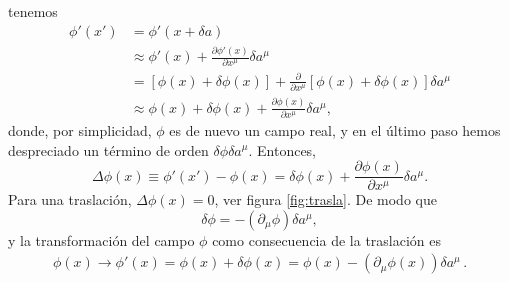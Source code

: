 tenemos
\begin{align}
  \phi'(x')&=\phi'(x+\delta a)\\
  &\approx\phi'(x)+\frac{\partial\phi'(x)}{\partial x^\mu}\delta a^\mu\\
  &=[\phi(x)+\delta\phi(x)]+\frac{\partial}{\partial x^\mu}[\phi(x)+\delta\phi(x)]\delta a^\mu\\
  &\approx\phi(x)+\delta\phi(x)+\frac{\partial\phi(x)}{\partial x^\mu}\delta a^\mu,
\end{align}
donde, por simplicidad, $\phi$ es de nuevo un campo real, y en el último paso hemos despreciado un término de orden $\delta\phi\delta a^\mu$. Entonces,
\begin{equation}
  \label{eq:Deltaf}
  \Delta\phi(x)\equiv\phi'(x')-\phi(x)=\delta\phi(x)+\frac{\partial\phi(x)}{\partial x^\mu}\delta a^\mu.
\end{equation}
Para una traslación, $\Delta\phi(x)=0$, ver figura 
\ref{fig:trasla}. %
De modo que
\begin{equation}
  \label{eq:dmuxmu}
  \delta\phi=-(\partial_\mu\phi)\delta a^\mu,
\end{equation}
y la transformación del campo $\phi$ como consecuencia de la traslación es
\begin{align}
  \phi(x)\to\phi'(x)=\phi(x)+\delta\phi(x)=\phi(x)-(\partial_\mu\phi(x))\delta a^\mu\,.
\end{align}

